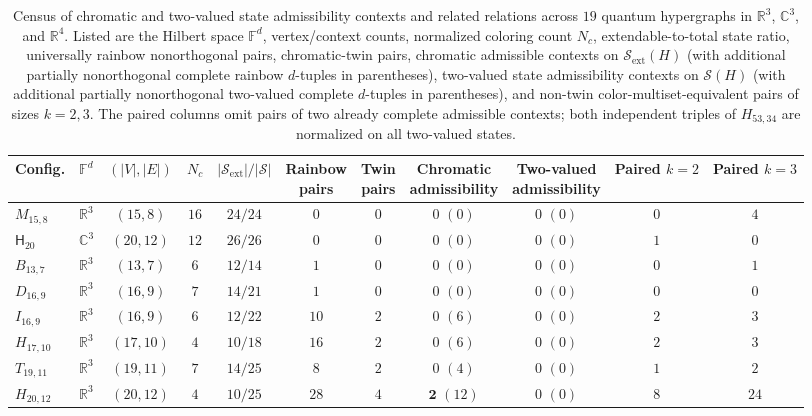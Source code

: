 \documentclass[aps,pra,reprint,superscriptaddress,longbibliography,nofootinbib,floatfix,10pt]{revtex4-2}
\theoremstyle{definition}\newtheorem{definition}[theorem]{Definition}
\theoremstyle{remark}\newtheorem{remark}[theorem]{Remark}
\newcommand{\C}{\mathbb C}\newcommand{\R}{\mathbb R}\newcommand{\Q}{\mathbb Q}
\newcommand{\F}{\mathbb F}\newcommand{\Z}{\mathbb Z}\newcommand{\PP}{\mathbb P}
\newcommand{\Sc}{\mathcal S}\newcommand{\Cc}{\mathcal C}\newcommand{\Wc}{\mathcal W}
\newcommand{\Htwenty}{\mathsf H_{20}}
\begin{document}
\begin{table}[!htbp]
\caption{Census of chromatic and two-valued state admissibility contexts and related relations across $19$ quantum hypergraphs in $\R^3$, $\C^3$, and $\R^4$. Listed are the Hilbert space $\F^d$, vertex/context counts, normalized coloring count $N_c$, extendable-to-total state ratio, universally rainbow nonorthogonal pairs, chromatic-twin pairs, chromatic admissible contexts on $\Sc_{\mathrm{ext}}(H)$ (with additional partially nonorthogonal complete rainbow $d$-tuples in parentheses), two-valued state admissibility contexts on $\Sc(H)$ (with additional partially nonorthogonal two-valued complete $d$-tuples in parentheses), and non-twin color-multiset-equivalent pairs of sizes $k=2,3$. The paired columns omit pairs of two already complete admissible contexts; both independent triples of $H_{53,34}$ are normalized on all two-valued states.}\label{tab:master-chromatic-relations}
\footnotesize\renewcommand{\arraystretch}{1.22}\setlength{\tabcolsep}{3pt}
\begin{ruledtabular}
\begin{tabular}{llccccccccc}
Config. & $\F^d$ & $(|V|,|E|)$ & $N_c$ & $|\Sc_{\mathrm{ext}}|/|\Sc|$ & \shortstack{Rainbow\\pairs} & \shortstack{Twin\\pairs} & \shortstack{Chromatic\\admissibility} & \shortstack{Two-valued\\admissibility} & Paired $k=2$ & Paired $k=3$\\\hline
$M_{15,8}$ & $\R^3$ & $(15,8)$ & $16$ & $24/24$ & $0$ & $0$ & $0$ $(0)$ & $0$ $(0)$ & $0$ & $4$\\
$\Htwenty$ & $\C^3$ & $(20,12)$ & $12$ & $26/26$ & $0$ & $0$ & $0$ $(0)$ & $0$ $(0)$ & $1$ & $0$\\
$B_{13,7}$ & $\R^3$ & $(13,7)$ & $6$ & $12/14$ & $1$ & $0$ & $0$ $(0)$ & $0$ $(0)$ & $0$ & $1$\\
$D_{16,9}$ & $\R^3$ & $(16,9)$ & $7$ & $14/21$ & $1$ & $0$ & $0$ $(0)$ & $0$ $(0)$ & $0$ & $0$\\
$I_{16,9}$ & $\R^3$ & $(16,9)$ & $6$ & $12/22$ & $10$ & $2$ & $0$ $(6)$ & $0$ $(0)$ & $2$ & $3$\\
$H_{17,10}$ & $\R^3$ & $(17,10)$ & $4$ & $10/18$ & $16$ & $2$ & $0$ $(6)$ & $0$ $(0)$ & $2$ & $3$\\
$T_{19,11}$ & $\R^3$ & $(19,11)$ & $7$ & $14/25$ & $8$ & $2$ & $0$ $(4)$ & $0$ $(0)$ & $1$ & $2$\\
$H_{20,12}$ & $\R^3$ & $(20,12)$ & $4$ & $10/25$ & $28$ & $4$ & $\mathbf{2}$ $(12)$ & $0$ $(0)$ & $8$ & $24$\\

\end{tabular}
\end{ruledtabular}
\end{table}
\end{document}
